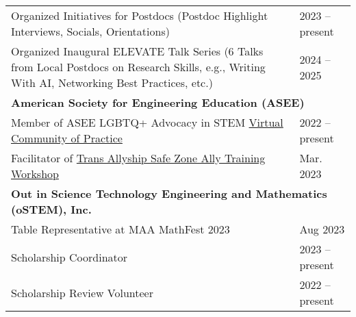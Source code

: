 \documentclass[letterpaper,11pt]{article}
\begin{document}
\begin{longtable}{@{}p{}l@{}}
  \hspace{3mm} Organized Initiatives for Postdocs (Postdoc Highlight Interviews, Socials, Orientations)                                                                                                       & 2023 -- present  \\
  \hspace{3mm} Organized Inaugural ELEVATE Talk Series (6 Talks from Local Postdocs on Research Skills, e.g., Writing With AI, Networking Best Practices, etc.)                                                   & 2024 -- 2025     \\ [4pt]
  \multicolumn{2}{l}{\hspace{-3mm} \bf{American Society for Engineering Education (ASEE)}}                                                                                                                                           \\
  \hspace{3mm} Member of ASEE LGBTQ+ Advocacy in STEM \href{https://lgbtq.asee.org/our-community/}{Virtual Community of Practice}                                                                                 & 2022 -- present  \\
  \hspace{3mm} Facilitator of \href{https://lgbtq.asee.org/ally-training/online-workshops/#:~:text=Safe\%20Zone\%20Ally\%20Training\%3A\%20Tans\%20Allyship}{Trans Allyship Safe Zone Ally Training Workshop}     & Mar. 2023        \\ [4pt]
  \multicolumn{2}{l}{\hspace{-3mm} \bf{Out in Science Technology Engineering and Mathematics (oSTEM), Inc.}}                                                                                                                         \\
  \hspace{3mm} Table Representative at MAA MathFest 2023                                                                                                                                                          & Aug 2023         \\
  \hspace{3mm} Scholarship Coordinator                                                                                                                                                                            & 2023 -- present  \\
  \hspace{3mm} Scholarship Review Volunteer                                                                                                                                                                       & 2022 -- present  \\

\end{longtable}
\end{document}
